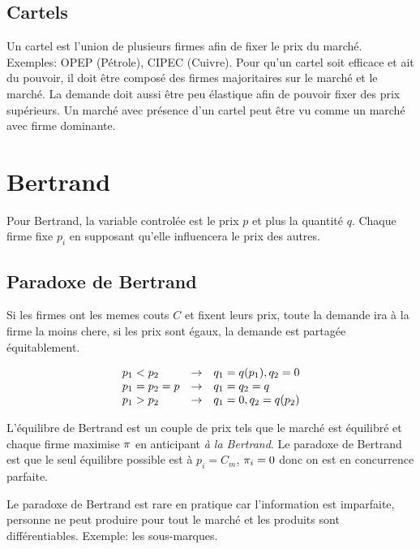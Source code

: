 

\subsection{Cartels}
Un cartel est l'union de plusieurs firmes afin de fixer le prix du marché.
Exemples: OPEP (Pétrole), CIPEC (Cuivre).
Pour qu'un cartel soit efficace et ait du pouvoir, il doit être composé
des firmes majoritaires sur le marché et le marché. La demande doit aussi
être peu élastique afin de pouvoir fixer des prix supérieurs.
Un marché avec présence d'un cartel peut être vu comme un marché avec firme dominante.


\section{Bertrand}
Pour Bertrand, la variable controlée est le prix $p$ et plus la quantité $q$.
Chaque firme fixe $p_i$ en supposant qu'elle influencera le prix des autres.

\subsection{Paradoxe de Bertrand}
Si les firmes ont les memes couts $C$ et fixent leurs prix,
toute la demande ira à la firme la moins chere, 
si les prix sont égaux, la demande est partagée équitablement.

\begin{equation}
	\begin{array}{l c l}
	p_1 < p_2 &\rightarrow& q_1 = q(p_1), q_2 = 0 \\
	p_1 = p_2 = p &\rightarrow& q_1 = q_2 = q \\
	p_1 > p_2 &\rightarrow& q_1 = 0, q_2 = q(p_2)
	\end{array}
\end{equation}

L'équilibre de Bertrand est un couple de prix tels que le marché est équilibré
et chaque firme maximise $\pi$ en anticipant \emph{à la Bertrand}.
Le paradoxe de Bertrand est que le seul équilibre possible est à
$p_i = C_{m}$, $\pi_i = 0$ donc on est en concurrence parfaite.

Le paradoxe de Bertrand est rare en pratique car l'information est imparfaite,
personne ne peut produire pour tout le marché et les produits sont différentiables.
Exemple: les sous-marques.


